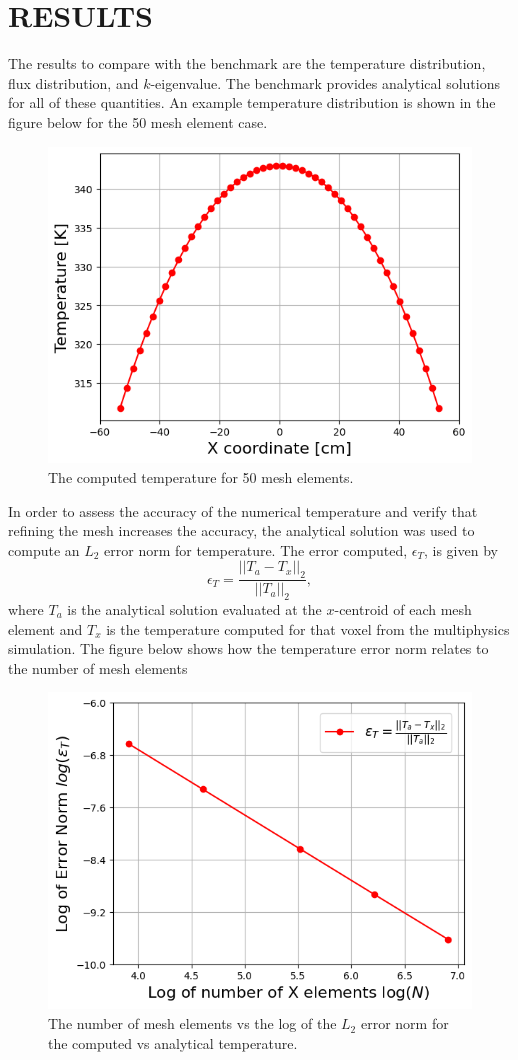 \documentclass[letterpaper]{mc2023}
\begin{document}
\section{RESULTS}\label{sec:results}
The results to compare with the benchmark are the temperature distribution, flux distribution, and $k$-eigenvalue. The benchmark provides
analytical solutions for all of these quantities. An example temperature distribution is shown in the figure below for the 50 mesh element case.
\begin{figure}[H]
    \centering
    \includegraphics[width=0.35\linewidth]{figures/temp_50.png}
    \caption{The computed temperature for 50 mesh elements.}
    \label{fig:temp50}
\end{figure}
In order to assess the accuracy of the numerical temperature and verify that refining the mesh increases the accuracy, the analytical solution
was used to compute an $L_{2}$ error norm for temperature. The error computed, $\epsilon_{T}$, is given by
\begin{equation}
    \epsilon_{T} = \frac{|| T_{a} - T_{x} ||_{2}}{|| T_{a} ||_{2}},
\end{equation}
where $T_{a}$ is the analytical solution evaluated at the $x$-centroid of each mesh element and $T_{x}$ is the temperature computed for that
voxel from the multiphysics simulation. The figure below shows how the temperature error norm relates to the number of mesh elements
\begin{figure}[H]
    \centering
    \includegraphics[width=0.45\linewidth]{figures/temp_error_norms.png}
    \caption{The number of mesh elements vs the log of the $L_{2}$ error norm for the computed vs analytical temperature.}
    \label{fig:temp_error_study}
\end{figure}
\end{document}
